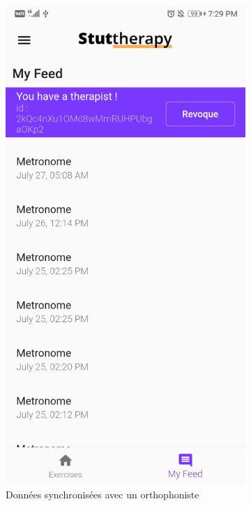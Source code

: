 \begin{appendices}
\begin{landscape}
\begin{figure}[h]
  \begin{subfigure}{.25\textwidth}
    \centering
    \includegraphics[width=.75\linewidth]{content/imgs/screen13.jpg}
    \caption{Données synchronisées avec un orthophoniste}
    \label{appendix:screen_add_therapist}
  \end{subfigure}%
  \begin{subfigure}{.25\textwidth}
    \centering

\end{subfigure}
\end{figure}
\end{landscape}
\end{appendices}
